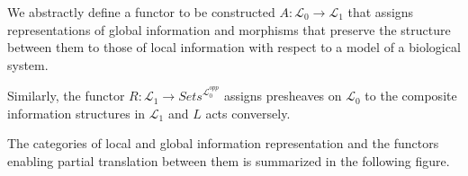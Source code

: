 \begin{frame}
\begin{block}{}
We abstractly define a functor to be constructed $A:\mathcal{L}_0 \rightarrow \mathcal{L}_1$ that assigns representations of global information and morphisms that preserve the structure between them to those of local information with respect to a model of a biological system.  
\end{block}
\pause \begin{block}{}
Similarly, the functor $R: \mathcal{L}_1 \rightarrow \textit{Sets}^{\mathcal{L}_0^{opp}}$ assigns presheaves on $\mathcal{L}_0$ to the composite information structures in $\mathcal{L}_1$ and $L$ acts conversely. 
\end{block}
\pause \begin{block}{}
The categories of local and global information representation and the functors enabling partial translation between them is summarized in the following figure.
\end{block}
\end{frame}